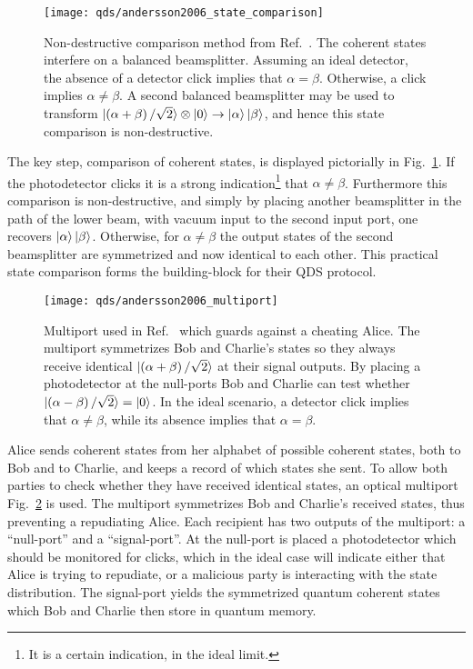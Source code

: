 \begin{figure}[htp]
\captionsetup{width=\linewidth}
\centering
\texttt{[image: qds/andersson2006\_state\_comparison]}
\caption{\label{fig:andersson2006_state_comparison} Non-destructive comparison method from Ref.~\cite{Andersson2006}. The coherent states interfere on a balanced beamsplitter. Assuming an ideal detector, the absence of a detector click implies that $\alpha = \beta$. Otherwise, a click implies $\alpha \ne \beta$. A second balanced beamsplitter may be used to transform $\ket{\left(\alpha+\beta\right)/\sqrt{2}}\otimes\ket{0}\rightarrow\ket{\alpha}\ket{\beta}$, and hence this state comparison is non-destructive.}
\end{figure}

The key step, comparison of coherent states, is displayed pictorially in Fig.~\ref{fig:andersson2006_state_comparison}. If the photodetector clicks it is a strong indication\footnote{It is a certain indication, in the ideal limit.} that $\alpha \ne \beta$. Furthermore this comparison is non-destructive, and simply by placing another beamsplitter in the path of the lower beam, with vacuum input to the second input port, one recovers $\ket{\alpha}\ket{\beta}$. Otherwise, for $\alpha \ne \beta$ the output states of the second beamsplitter are symmetrized and now identical to each other. This practical state comparison forms the building-block for their QDS protocol. 

\begin{figure}[htp]
\captionsetup{width=\linewidth}
\centering
\texttt{[image: qds/andersson2006\_multiport]}
\caption{\label{fig:andersson2006_multiport} Multiport used in Ref.~\cite{Andersson2006} which guards against a cheating Alice. The multiport symmetrizes Bob and Charlie's states so they always receive identical $\ket{\left(\alpha+\beta\right)/\sqrt{2}}$ at their signal outputs. By placing a photodetector at the null-ports Bob and Charlie can test whether $\ket{\left(\alpha-\beta\right)/\sqrt{2}} = \ket{0}$. In the ideal scenario, a detector click implies that $\alpha\ne\beta$, while its absence implies that $\alpha = \beta$. }
\end{figure}

Alice sends coherent states from her alphabet of possible coherent states, both to Bob and to Charlie, and keeps a record of which states she sent. To allow both parties to check whether they have received identical states, an optical multiport Fig.~\ref{fig:andersson2006_multiport} is used. The multiport symmetrizes Bob and Charlie's received states, thus preventing a repudiating Alice. Each recipient has two outputs of the multiport: a ``null-port'' and a ``signal-port''. At the null-port is placed a photodetector which should be monitored for clicks, which in the ideal case will indicate either that Alice is trying to repudiate, or a malicious party is interacting with the state distribution. The signal-port yields the symmetrized quantum coherent states which Bob and Charlie then store in quantum memory.

